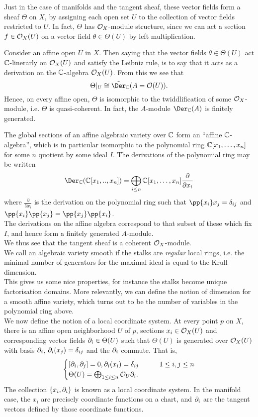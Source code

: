 \documentclass[a4paper]{article}
\begin{document}
Just in the case of manifolds and the tangent sheaf, these vector fields form a sheaf $\Theta$ on $X$, by assigning each open set $U$ to the collection of vector fields restricted to $U$. In fact, $\Theta$ has $\mathcal{O}_X$-module structure, since we can act a section $f\in \mathcal{O}_X(U)$ on a vector field $\theta \in \Theta(U)$ by left multiplication. 

Consider an affine open $U$ in $X$. Then saying that the vector fields $\theta \in \Theta(U)$ act $\mathbb{C}$-linerarly on $\mathcal{O}_X(U)$ and satisfy the Leibniz rule, is to say that it acts as a derivation on the $\mathbb{C}$-algebra $\mathcal{O}_X(U)$. From this we see that
\[
    \Theta|_{U} \isom \tilde{\Der}_\bC(A = \cO(U)).
\]
Hence, on every affine open, $\Theta$ is isomorphic to the twiddlification of some $\mathcal{O}_X$-module, i.e. $\Theta$ is quasi-coherent. In fact, the $A$-module $\Der_\bC(A)$ is finitely generated.

The global sections of an affine algebraic variety over $\mathbb{C}$ form an ``affine $\mathbb{C}$-algebra'', which is in particular isomorphic to the polynomial ring $\mathbb{C}[x_1,\dots,x_n]$ for some $n$ quotient by some ideal $I$. The derivations of the polynomial ring may be written
\[
    \Der_{\bC}(\bC[x_1,..,x_n]) = \bigoplus_{i\leq n} \bC[x_1,\dots,x_n] \frac{\partial}{\partial x_i}
\]
where $\frac{\partial}{\partial x_i}$ is the derivation on the polynomial ring such that $\pp{x_i} x_j = \delta_{ij}$ and $\pp{x_i}\pp{x_j} = \pp{x_j}\pp{x_i}$.\\
The derivations on the affine algebra correspond to that subset of these which fix $I$, and hence form a finitely generated $A$-module.\\
We thus see that the tangent sheaf is a coherent $\mathcal{O}_X$-module.\\

We call an algebraic variety smooth if the stalks are \emph{regular} local rings, i.e. the minimal number of generators for the maximal ideal is equal to the Krull dimension.\\
This gives us some nice properties, for instance the stalks become unique factorisation domains. More relevantly, we can define the notion of dimension for a smooth affine variety, which turns out to be the number of variables in the polynomial ring above.\\
We now define the notion of a local coordinate system. At every point $p$ on $X$, there is an affine open neighborhood $U$ of $p$, sections $x_i \in \mathcal{O}_X(U)$ and corresponding vector fields $\partial_i \in \Theta(U)$ such that $\Theta(U)$ is generated over $\mathcal{O}_X(U)$ with basis $\partial_i$, $\partial_i(x_j) = \delta_{ij}$ and the $\partial_i$ commute. That is,
\[
    \begin{cases}
        [\partial_i, \partial_j] = 0, \partial_{i}(x_i) = \delta_{ij} &\qquad 1\leq i,j \leq n\\
        \Theta(U) = \bigoplus_{1\leq i \leq n} \mathcal{O}_U \partial_{i}.
    \end{cases}
\]
The collection $\{x_i, \partial_i\}$ is known as a local coordinate system. In the manifold case, the $x_i$ are precisely coordinate functions on a chart, and $\partial_i$ are the tangent vectors defined by those coordinate functions.
\end{document}
